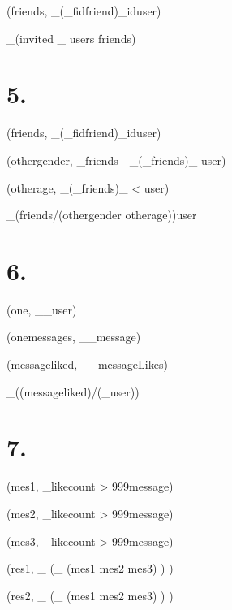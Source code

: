 \documentclass{article}
\begin{document}
\rho(friends, \pi_{}(\pi_{fid}friend)\bowtie_{id}user)


\pi_{}(invited \bowtie_{} users \cup friends)



\chapter{5.}

\rho(friends, \pi_{}(\pi_{fid}friend)\bowtie_{id}user)

\rho(othergender, \pi_{}friends - \pi_{}(\pi_{}friends)\bowtie_{} user)

\rho(otherage, \pi_{}(\pi_{}friends)\bowtie_{ < }user)

\pi_{}(friends/(othergender \cap otherage))user


\chapter{6.}

\rho(one, \pi_{}\sigma_{}user)

\rho(onemessages, \pi_{}\rho_{}message)

\rho(messageliked, \pi_{}\sigma_{}messageLikes)

\pi_{}((messageliked)/(\pi_{}user))


\chapter{7.}


\rho(mes1, \sigma_{likecount > 999}message)

\rho(mes2, \sigma_{likecount > 999}message)

\rho(mes3, \sigma_{likecount > 999}message)

\rho(res1, \pi_{} (\sigma_{ \neq {} \wedge {} \neq {} \wedge {}  \neq {}}(mes1 \times mes2 \times mes3) ) )

\rho(res2, \pi_{} (\sigma_{ \neq {} \wedge {} \neq {} \wedge {}  \neq {}}(mes1 \times mes2 \times mes3) ) )
\end{document}
